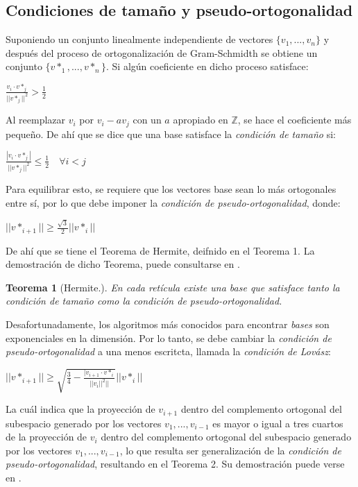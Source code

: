 \documentclass{llncs}
\newtheorem{teor}{Teorema}
\begin{document}
	\subsection{Condiciones de tamaño y pseudo-ortogonalidad} 
	Suponiendo un conjunto linealmente independiente de vectores $\{v_1,...,v_n\}$ y despu\'es del proceso de ortogonalizaci\'on de Gram-Schmidth se obtiene un conjunto $\{v*_1,...,v*_n\}$. Si algún coeficiente en dicho proceso satisface:

		\centerline{$\frac{v_i \cdot v*_j }{||v*_j ||^2} > \frac{1}{2}$}

	Al reemplazar $v_i$ por $v_i-av_j$ con un $a$ apropiado en $\mathbb{Z}$, se hace el coeficiente m\'as pequeño. De ah\'i que se dice que una base satisface la \textit{condici\'on de tamaño} si: 

		\centerline{$\frac{|v_i \cdot v*_j|}{||v*_j||^2} \leq \frac{1}{2} \quad \forall  i<j$}
	Para equilibrar esto, se requiere que los vectores base sean lo m\'as ortogonales entre s\'i, por lo que debe imponer la \textit{condici\'on de pseudo-ortogonalidad}, donde:

		\centerline{$|| v*_{i+1}|| \geq \frac{\sqrt{3}}{2}||v*_i||$}

	De ah\'i que se tiene el Teorema de Hermite, deifnido en el Teorema 1. La demostraci\'on de dicho Teorema, puede consultarse en \cite{b14}.

	\begin{teor}[Hermite.] En cada ret\'icula existe una base que satisface tanto la condici\'on de tamaño como la condici\'on de pseudo-ortogonalidad.
	\end{teor}

	Desafortunadamente, los algoritmos m\'as conocidos para encontrar \textit{bases} son exponenciales en la dimensi\'on. Por lo tanto, se debe cambiar la \textit{condici\'on de pseudo-ortogonalidad} a una menos escritcta, llamada la \textit{condici\'on de Lov\'asz}:

		\centerline{$|| v*_{i+1} || \geq \sqrt{\frac{3}{4} - \frac{| v_{i+1} \cdot v*_i} {||v_i||^2||}} ||v*_i||$ }

	La cu\'al indica que la proyecci\'on de $v_{i+1}$ dentro del complemento ortogonal del subespacio generado por los vectores $v_1,...,v_{i-1}$ es mayor o igual a tres cuartos de la proyecci\'on de $v_i$ dentro del complemento ortogonal del subespacio generado por los vectores $v_1,...,v_{i-1}$, lo que resulta ser generalizaci\'on de la \textit{condici\'on de pseudo-ortogonalidad}, resultando en el Teorema 2. Su demostraci\'on puede verse en \cite{b14}.
\end{document}
